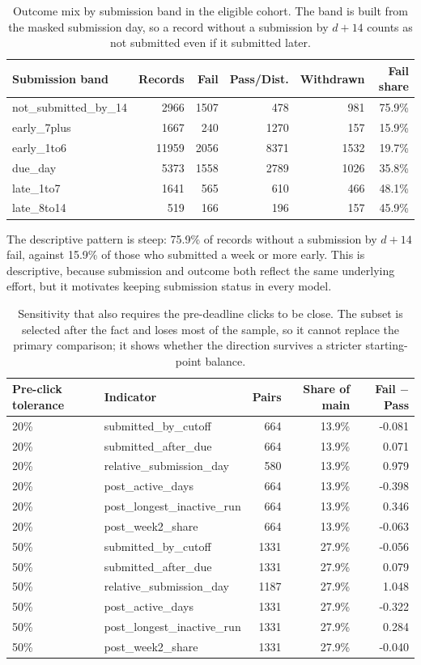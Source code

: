 \documentclass[11pt]{article}
\begin{document}
\begin{table}[t]
\centering
\footnotesize
\begin{tabular}{lrrrrr}
\toprule
Submission band & Records & Fail & Pass/Dist. & Withdrawn & Fail share \\
\midrule
not\_submitted\_by\_14 & 2966 & 1507 & 478 & 981 & 75.9\% \\
early\_7plus & 1667 & 240 & 1270 & 157 & 15.9\% \\
early\_1to6 & 11959 & 2056 & 8371 & 1532 & 19.7\% \\
due\_day & 5373 & 1558 & 2789 & 1026 & 35.8\% \\
late\_1to7 & 1641 & 565 & 610 & 466 & 48.1\% \\
late\_8to14 & 519 & 166 & 196 & 157 & 45.9\% \\
\bottomrule
\end{tabular}
\caption{Outcome mix by submission band in the eligible cohort. The band is built from the masked submission day, so a record without a submission by $d+14$ counts as not submitted even if it submitted later.}
\label{tab:bands}
\end{table}
The descriptive pattern is steep: 75.9\% of records without a submission by $d+14$ fail, against 15.9\% of those who submitted a week or more early. This is descriptive, because submission and outcome both reflect the same underlying effort, but it motivates keeping submission status in every model.
\begin{table}[t]
\centering
\scriptsize
\begin{tabular}{llrrr}
\toprule
Pre-click tolerance & Indicator & Pairs & Share of main & Fail $-$ Pass \\
\midrule
20\% & submitted\_by\_cutoff & 664 & 13.9\% & -0.081 \\
20\% & submitted\_after\_due & 664 & 13.9\% & 0.071 \\
20\% & relative\_submission\_day & 580 & 13.9\% & 0.979 \\
20\% & post\_active\_days & 664 & 13.9\% & -0.398 \\
20\% & post\_longest\_inactive\_run & 664 & 13.9\% & 0.346 \\
20\% & post\_week2\_share & 664 & 13.9\% & -0.063 \\
50\% & submitted\_by\_cutoff & 1331 & 27.9\% & -0.056 \\
50\% & submitted\_after\_due & 1331 & 27.9\% & 0.079 \\
50\% & relative\_submission\_day & 1187 & 27.9\% & 1.048 \\
50\% & post\_active\_days & 1331 & 27.9\% & -0.322 \\
50\% & post\_longest\_inactive\_run & 1331 & 27.9\% & 0.284 \\
50\% & post\_week2\_share & 1331 & 27.9\% & -0.040 \\
\bottomrule
\end{tabular}
\caption{Sensitivity that also requires the pre-deadline clicks to be close. The subset is selected after the fact and loses most of the sample, so it cannot replace the primary comparison; it shows whether the direction survives a stricter starting-point balance.}
\label{tab:presens}
\end{table}
\end{document}
